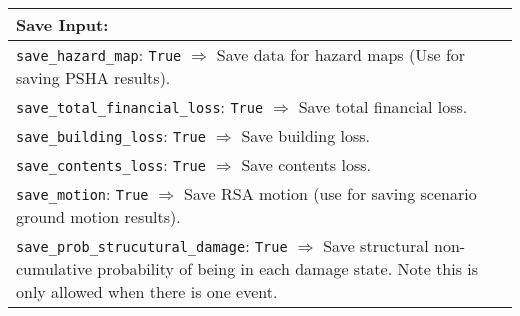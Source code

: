 \documentclass[a4paper, 12pt]{report}
\begin{document}
\vspace{2em}
\begin{tabular}{|p{\textwidth}|}
\hline
\vspace{0.3em} \noindent \Large \textbf{Save Input:} \normalsize \\
\hline
\vspace{0.1em} \texttt{save\_hazard\_map}: 
\texttt{True} $\Rightarrow$ Save data for hazard maps (Use for saving PSHA results). \\
\hline
\vspace{0.1em} \texttt{save\_total\_financial\_loss}:
\texttt{True} $\Rightarrow$ Save total financial loss. \\
 \hline
\vspace{0.1em} \texttt{save\_building\_loss}: 
\texttt{True} $\Rightarrow$ Save building loss. \\
 \hline
\vspace{0.1em} \texttt{save\_contents\_loss}: 
 \texttt{True} $\Rightarrow$ Save contents loss. \\
\hline
\vspace{0.1em} \texttt{save\_motion}: 
\texttt{True} $\Rightarrow$ Save RSA motion (use for saving scenario ground motion results). \\
\hline
\vspace{0.1em} \texttt{save\_prob\_strucutural\_damage}: 
\texttt{True} $\Rightarrow$ Save structural non-cumulative probability of being in each
damage state.  Note this is only allowed when there is one event. \\
\hline
 \end{tabular}
\end{document}

